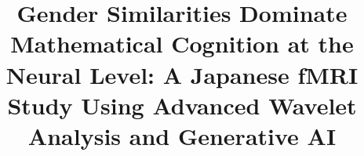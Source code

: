 \documentclass[pdflatex,sn-nature]{sn-jnl}%
\theoremstyle{thmstyleone}%
\theoremstyle{thmstyletwo}%
\theoremstyle{thmstylethree}%
\begin{document}
\title[Gender Similarities Dominate Mathematical Cognition at the Neural Level: A Japanese fMRI Study Using Advanced Wavelet Analysis and Generative AI]{Gender Similarities Dominate Mathematical Cognition at the Neural Level: A Japanese fMRI Study Using Advanced Wavelet Analysis and Generative AI}


\author{ }






\end{document}
